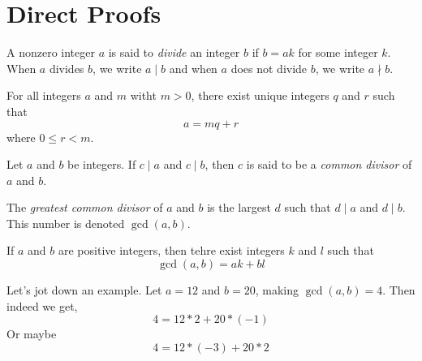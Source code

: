 \chapter{Direct Proofs}

\begin{definition}
	\label{divisibility}
	A nonzero integer $a$ is said to \emph{divide} an integer $b$ if $b = ak$ for some integer $k$. When $a$ divides $b$, we write $a \mid b$ and when $a$ does not divide $b$, we write $a \nmid b$.
\end{definition}

\begin{theorem}
	\label{divalgo}
	For all integers $a$ and $m$ witht $m > 0$, there exist unique integers $q$ and $r$ such that 
	$$a = mq+r$$
	where $0 \leq r < m$.
\end{theorem}

\begin{definition}
	Let $a$ and $b$ be integers. If $c \mid a$ and $c \mid b$, then $c$ is said to be a \emph{common divisor} of $a$ and $b$.

	The \emph{greatest common divisor} of $a$ and $b$ is the largest $d$ such that $d \mid a$ and $d \mid b$. This number is denoted $\gcd(a,b)$.
\end{definition}

\begin{theorem}
	If $a$ and $b$ are positive integers, then tehre exist integers $k$ and $l$ such that $$\gcd(a,b) = ak + bl$$
\end{theorem}

\begin{scratch}
Let's jot down an example. Let $a = 12$ and $b = 20$, making $\gcd(a, b) = 4$.
Then indeed we get, $$4 = 12*2 + 20*(-1)$$
Or maybe $$4 = 12*(-3) + 20*2$$
\end{scratch}

